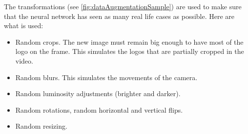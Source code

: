 \documentclass[12pt]{article}%
\begin{document}
The transformations (see \ref{fig:dataAugmentationSample}) are used to make sure that the neural network has seen as many real life cases as possible. Here are what is used:
\begin{itemize}
    \item Random crops. The new image must remain big enough to have most of the logo on the frame. This simulates the logos that are partially cropped in the video.
    \item Random blurs. This simulates the movements of the camera.
    \item Random luminosity adjustments (brighter and darker).
    \item Random rotations, random horizontal and vertical flips.
    \item Random resizing.
\end{itemize}
\end{document}
